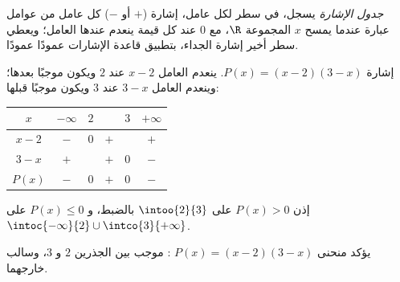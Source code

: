 \begin{definition}\label{def:g10:algebra:signtable}
\emph{جدول الإشارة} يسجل، في سطر لكل عامل،
إشارة ($+$ أو $-$) كل عامل من عوامل عبارة عندما يمسح $x$ المجموعة $\R$،
مع $0$ عند كل قيمة ينعدم عندها العامل؛ ويعطي سطر أخير
إشارة الجداء، بتطبيق قاعدة الإشارات عمودًا عمودًا.
\end{definition}

\begin{example}\label{ex:g10:algebra:signtable}
إشارة $P(x) = (x - 2)(3 - x)$. ينعدم العامل $x - 2$ عند $2$ ويكون
موجبًا بعدها؛ وينعدم العامل $3 - x$ عند $3$ ويكون موجبًا قبلها:
\begin{center}
\renewcommand{\arraystretch}{1.3}
\begin{tabular}{c|ccccc}
$x$ & $-\infty$ \quad & $2$ & & $3$ & \quad $+\infty$ \\
\hline
$x - 2$ & $-$ & $0$ & $+$ & & $+$ \\
$3 - x$ & $+$ & & $+$ & $0$ & $-$ \\
\hline
$P(x)$ & $-$ & $0$ & $+$ & $0$ & $-$ \\
\end{tabular}
\end{center}
إذن $P(x) > 0$ على $\intoo{2}{3}$ بالضبط، و $P(x) \leq 0$ على
$\intoc{-\infty}{2} \cup \intco{3}{+\infty}$.
\end{example}

\begin{omfigure}

{\small يؤكد منحنى $P(x) = (x-2)(3-x)$ : موجب
بين الجذرين $2$ و $3$، وسالب خارجهما.}
\end{omfigure}

